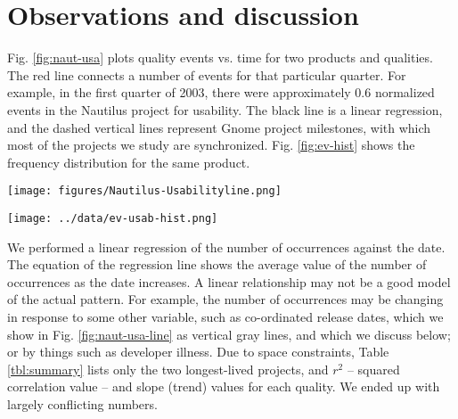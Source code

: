\documentclass[conference, compsoc]{IEEEtran}
\begin{document}
\section{Observations and discussion}
\label{sec:observations}
Fig. \ref{fig:naut-usa} plots quality events vs. time for two products and qualities. The red line connects a number of events for that particular quarter. For example, in the first quarter of 2003, there were approximately 0.6 normalized events in the Nautilus project for usability. The black line is a linear regression, and the dashed vertical lines represent Gnome project milestones, with which most of the projects we study are synchronized. Fig. \ref{fig:ev-hist} shows the frequency distribution for the same product.
\begin{figure*}[]
\begin{minipage}[]{0.5\textwidth}
\centering
\texttt{[image: figures/Nautilus-Usabilityline.png]}
\label{fig:naut-usa}
\caption{Occurrences per week}
\end{minipage}%
\hspace{0.2cm}
\begin{minipage}[]{0.5\textwidth}
\centering
\texttt{[image: ../data/ev-usab-hist.png]}
\label{fig:ev-hist}
\caption{Frequency distribution}
\end{minipage}
\end{figure*}

We performed a linear regression of the number of occurrences against the date. The equation of the regression line shows the average value of the number of occurrences as the date increases. A linear relationship may not be a good model of the actual pattern. For example, the number of occurrences may be changing in response to some other variable, such as co-ordinated release dates, which we show in Fig. \ref{fig:naut-usa-line} as vertical gray lines, and which we discuss below; or by things such as developer illness. Due to space constraints, Table \ref{tbl:summary} lists only the two longest-lived projects, and $r^2$  -- squared correlation value -- and slope (trend) values for each quality. We ended up with largely conflicting numbers. 
\end{document}
